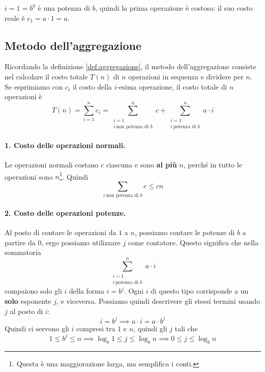 \begin{osservazione}
    $i=1 = b^0$ è una potenza di $b$, quindi la prima operazione è costosa: il suo costo reale è $c_1 = a \cdot 1 = a$.
\end{osservazione}

\subsection{Metodo dell'aggregazione}\label{sec:appendice_esercizi_analisi_ammortizzata_aggregazione}

Ricordando la definizione \ref{def:aggregazione}, il metodo dell'aggregazione consiste nel calcolare il costo totale $T(n)$ di $n$ operazioni in sequenza e dividere per $n$. Se esprimiamo con $c_i$ il costo della $i$-esima operazione, il costo totale di $n$ operazioni è
\[
T(n) = \sum_{i=1}^n c_i = \sum_{\substack{i=1 \\ i \ \text{non potenza di } b}}^n c + \sum_{\substack{i=1 \\ i \ \text{potenza di } b}}^n a \cdot i
\]

\paragraph{1. Costo delle operazioni normali.}
Le operazioni normali costano $c$ ciascuna e sono \textbf{al più} $n$, perché in tutto le operazioni sono $n$\footnote{Questa è una maggiorazione larga, ma semplifica i conti.}. Quindi
\[
\sum_{i \ \text{non potenza di } b} c \leq cn
\]

\paragraph{2. Costo delle operazioni potenze.}
Al posto di contare le operazioni da $1$ a $n$, possiamo contare le potenze di $b$ a partire da $0$, ergo possiamo utilizzare $j$ come contatore. Questo significa che nella sommatoria
\[
\sum_{\substack{i=1 \\ i \ \text{potenza di } b}}^n a \cdot i
\]
compaiono solo gli $i$ della forma $i = b^j$. Ogni $i$ di questo tipo corrisponde a un \textbf{solo} esponente $j$, e viceversa. Possiamo quindi descrivere gli stessi termini usando $j$ al posto di $i$:
\[
i = b^j \implies a \cdot i = a \cdot b^j
\]
Quindi ci servono gli $i$ compresi tra $1$ e $n$, quindi gli $j$ tali che
\[
1 \le b^j \le n \implies \log_b 1 \le j \le \log_b n \implies 0 \le j \le \log_b n
\]

